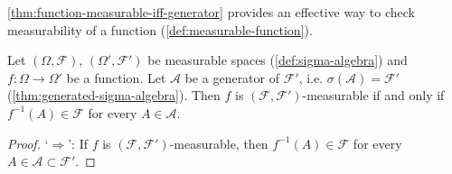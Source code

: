 \autoref{thm:function-measurable-iff-generator} provides an effective way to check measurability of a function (\autoref{def:measurable-function}).
\begin{fancytheorem}\label{thm:function-measurable-iff-generator}
  Let $(\Omega,\mathcal{F})$, $(\Omega',\mathcal{F}')$ be measurable spaces (\autoref{def:sigma-algebra}) and $f : \Omega \to \Omega'$ be a function.
  Let $\mathcal{A}$ be a generator of $\mathcal{F}'$, i.e. $\sigma(\mathcal{A}) = \mathcal{F}'$ (\autoref{thm:generated-sigma-algebra}).
  Then $f$ is $(\mathcal{F},\mathcal{F}')$-mea\-sur\-a\-ble if and only if $f^{-1}(A) \in \mathcal{F}$ for every $A \in \mathcal{A}$.
\end{fancytheorem}

\begin{proof}
`$\Rightarrow$':
If $f$ is $(\mathcal{F},\mathcal{F}')$-measurable, then $f^{-1}(A) \in \mathcal{F}$ for every $A \in \mathcal{A} \subset \mathcal{F}'$.


\end{proof}
